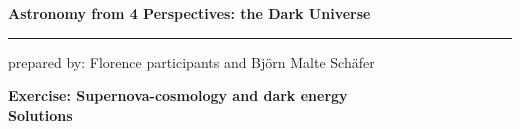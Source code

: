 \documentclass[a4paper,12pt]{article}
\newcommand{\HRule}{\rule{\linewidth}{0.3mm}}
\begin{document}
	\pagestyle{empty}
	
	\begin{center}
		\LARGE \textbf{Astronomy from 4 Perspectives: the Dark Universe}
		\HRule
	\end{center}
	\begin{flushright}
		prepared by: Florence participants and Bj{\"o}rn Malte Sch{\"a}fer
	\end{flushright}
	\begin{center}
		{\Large \textbf{Exercise: Supernova-cosmology and dark energy}}\\
		\vspace*{2mm}
		{\Large \textbf{Solutions}}
		
	\end{center}
	\vspace{5mm}
	
\end{document}
